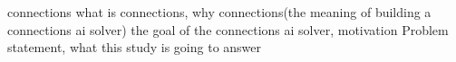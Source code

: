 \label{ch:background}


\todots

connections
what is connections, why connections(the meaning of building a connections ai solver)
the goal of the connections ai solver, motivation
Problem statement, what this study is going to answer
